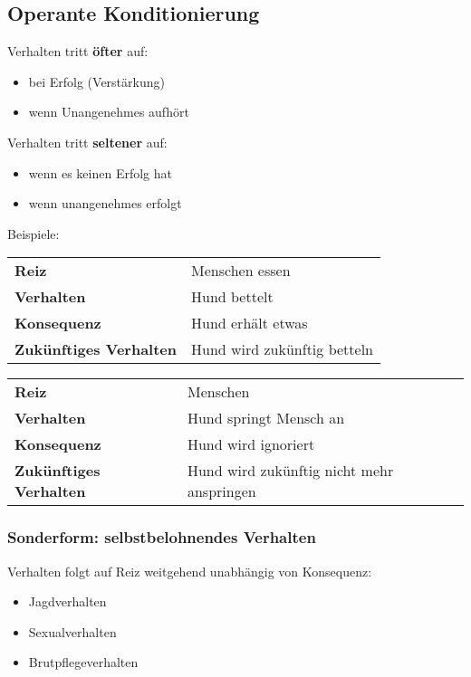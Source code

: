     \subsection{Operante Konditionierung}
        Verhalten tritt \textbf{öfter} auf:
        \begin{itemize}
            \item bei Erfolg (Verstärkung)
            \item wenn Unangenehmes aufhört
        \end{itemize}

        Verhalten tritt \textbf{seltener} auf:
        \begin{itemize}
            \item wenn es keinen Erfolg hat
            \item wenn unangenehmes erfolgt
        \end{itemize}

        Beispiele: \\
        \begin{tabular}{l|l}
            \textbf{Reiz} & Menschen essen \\
            \textbf{Verhalten} & Hund bettelt \\
            \textbf{Konsequenz} & Hund erhält etwas \\
            \textbf{Zukünftiges Verhalten} & Hund wird zukünftig betteln \\
        \end{tabular}

        \begin{tabular}{l|l}
            \textbf{Reiz} & Menschen \\
            \textbf{Verhalten} & Hund springt Mensch an \\
            \textbf{Konsequenz} & Hund wird ignoriert \\
            \textbf{Zukünftiges Verhalten} & Hund wird zukünftig nicht mehr anspringen \\
        \end{tabular}

        \subsubsection{Sonderform: selbstbelohnendes Verhalten}
            Verhalten folgt auf Reiz weitgehend unabhängig von Konsequenz:
            \begin{itemize}
                \item Jagdverhalten
                \item Sexualverhalten
                \item Brutpflegeverhalten
            \end{itemize}


